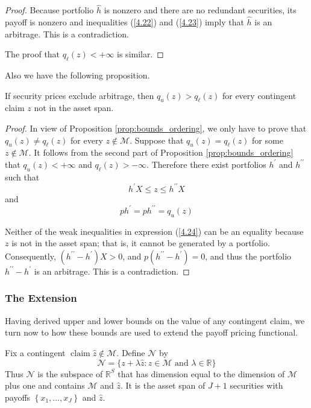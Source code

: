 \documentclass[\topdir/lecture\_notes.tex]{subfiles}
\begin{document}
\begin{optional}
\begin{proof}
Because portfolio $\hat{h}$ is nonzero and there are no redundant securities, its payoff is nonzero and inequalities (\ref{4.22}) and (\ref{4.23}) imply that $\hat{h}$ is an arbitrage. This is a contradiction.

The proof that $q_{\ell}(z)<+\infty$ is similar.
\end{proof}

Also we have the following proposition.

\begin{proposition} \label{prop:bounds_strict_inequality}
If security prices exclude arbitrage, then $q_{u}(z)>q_{\ell}(z)$ for every contingent claim $z$ not in the asset span.
\end{proposition}
\begin{proof}
In view of Proposition \ref{prop:bounds_ordering}, we only have to prove that $q_{u}(z) \neq q_{\ell}(z)$ for every $z \notin \mathcal{M}$. Suppose that $q_{u}(z)=q_{\ell}(z)$ for some $z \notin \mathcal{M}$. It follows from the second part of Proposition \ref{prop:bounds_ordering} that $q_{u}(z)<+\infty$ and $q_{\ell}(z)>-\infty$. Therefore there exist portfolios $h^{\prime}$ and $h^{\prime \prime}$ such that
\begin{equation}
h^{\prime} X \leq z \leq h^{\prime \prime} X \label{4.24}
\end{equation}
and
\begin{equation*}
p h^{\prime}=p h^{\prime \prime}=q_{u}(z) 
\end{equation*}

Neither of the weak inequalities in expression (\ref{4.24}) can be an equality because $z$ is not in the asset span; that is, it cannot be generated by a portfolio. Consequently, $\left(h^{\prime \prime}-h^{\prime}\right) X>0$, and $p\left(h^{\prime \prime}-h^{\prime}\right)=0$, and thus the portfolio $h^{\prime \prime}-h^{\prime}$ is an arbitrage. This is a contradiction.
\end{proof}

\subsubsection*{The Extension}
Having derived upper and lower bounds on the value of any contingent claim, we turn now to how these bounds are used to extend the payoff pricing functional.

Fix a contingent $\operatorname{claim} \hat{z} \notin \mathcal{M}$. Define $\mathcal{N}$ by
\begin{equation*}
\mathcal{N}=\{z+\lambda \hat{z}: z \in \mathcal{M} \text { and } \lambda \in \mathbb{R}\} 
\end{equation*}
Thus $\mathcal{N}$ is the subspace of $\mathbb{R}^{S}$ that has dimension equal to the dimension of $\mathcal{M}$ plus one and contains $\mathcal{M}$ and $\hat{z}$. It is the asset span of $J+1$ securities with payoffs $\left\{x_{1}, \ldots, x_{J}\right\}$ and $\hat{z}$.


\end{optional}
\end{document}
